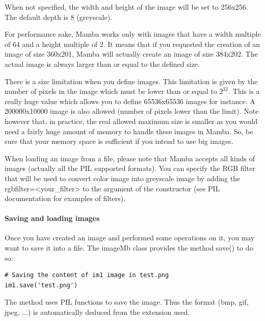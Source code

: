 \documentclass[a4paper,10pt,oneside]{article}
\begin{document}
When not specified, the width and height of the image will be set to 
256x256. The default depth is 8 (greyscale).

For performance sake, Mamba works only with images that have a width multiple of
64 and a height multiple of 2. It means that if you requested the creation of
an image of size 360x201, Mamba will actually create an image of size 384x202. 
The actual image is always larger than or equal to the defined size.

There is a size limitation when you define images. This limitation is given by
the number of pixels in the image which must be lower than or equal to $2^{32}$.
This is a really huge value which allows you to define 65536x65536 images for instance.
A 200000x10000 image is also allowed (number of pixels lower than the limit).
Note however that, in practice, the real allowed maximum size is smaller as you would
need a fairly huge amount of memory to handle these images in Mamba. So, be sure
that your memory space is sufficient if you intend to use big images.

When loading an image from a file, please note that Mamba accepts all 
kinds of images (actually all the PIL supported formats). You can specify
the RGB filter that will be used to convert color image into greyscale 
image by adding the rgbfilter=<your\_filter> to the argument of the
constructor (see PIL documentation for examples of filters).


\paragraph{Saving and loading images}

Once you have created an image and performed some operations on it, you may want 
to save it into a file. The imageMb class provides the method save() to do so:

\lstset{language=Python}
\begin{lstlisting}
# Saving the content of im1 image in test.png
im1.save('test.png')
\end{lstlisting}

The method uses PIL functions to save the image. Thus the format (bmp, gif, 
jpeg, ...) is automatically deduced from the extension used.
\end{document}
